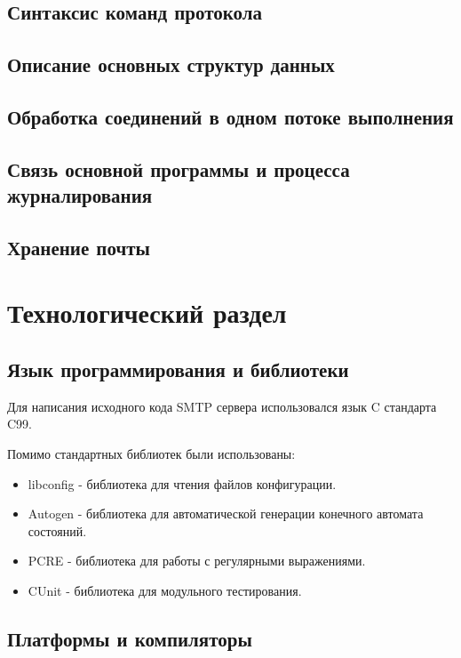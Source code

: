 \documentclass[a4paper,12pt]{report}
\begin{document}
\section{Синтаксис команд протокола}

\section{Описание основных структур данных}

\section{Обработка соединений в одном потоке выполнения}

\section{Связь основной программы и процесса журналирования}

\section{Хранение почты}

\chapter{Технологический раздел}

\section{Язык программирования и библиотеки}

Для написания исходного кода SMTP сервера использовался язык C стандарта C99.

Помимо стандартных библиотек были использованы:
\begin{itemize}
    \item libconfig - библиотека для чтения файлов конфигурации.  
    \item Autogen - библиотека для автоматической генерации конечного автомата состояний.
    \item PCRE - библиотека для работы с регулярными выражениями. 
    \item CUnit - библиотека для модульного тестирования.
\end{itemize}


\section{Платформы и компиляторы}
\end{document}
